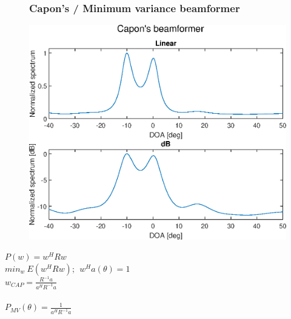 \documentclass{beamer}
\begin{document}
\begin{frame}
	\begin{figure}
    	\frametitle{Capon's / Minimum variance beamformer}
		\centering
    	\includegraphics[scale=0.4]{Capon.eps}\\
	\end{figure}
    $P(w) = w^H R w$\\
    $min_w\ E(w^H R w);\ \ w^H a(\theta)=1$\\
    $w_{CAP} = \frac{R^{-1} a}{a^H R^{-1} a}$\\
    \ \\
    $P_{MV}(\theta) = \frac{1}{a^H R^{-1} a}$\\
\end{frame}
\end{document}
